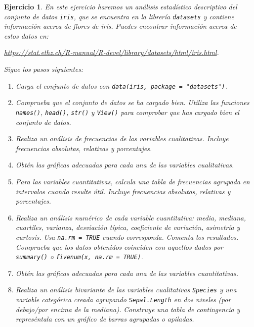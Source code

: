 \documentclass[11pt,a4paper]{article}
\theoremstyle{exercise}
\newtheorem{exercise}{Ejercicio}
\begin{document}
\begin{exercise} En este ejercicio haremos un análisis estadístico descriptivo del conjunto de datos \texttt{iris}, que se encuentra en la librería \texttt{datasets} y contiene información acerca de flores de iris. Puedes encontrar información acerca de estos datos en:

\begin{center}
	\url{https://stat.ethz.ch/R-manual/R-devel/library/datasets/html/iris.html}.
\end{center}

Sigue los pasos siguientes:

\begin{enumerate}
	\item Carga el conjunto de datos con \texttt{data(iris, package = "datasets")}.

	\item Comprueba que el conjunto de datos se ha cargado bien. Utiliza las funciones \texttt{names()}, \texttt{head()}, \texttt{str()} y \texttt{View()} para comprobar que has cargado bien el conjunto de datos.

	\item Realiza un análisis de frecuencias de las variables cualitativas. Incluye frecuencias absolutas, relativas y porcentajes.

	\item Obtén las gráficas adecuadas para cada una de las variables cualitativas. 

	\item Para las variables cuantitativas, calcula una tabla de frecuencias agrupada en intervalos cuando resulte útil. Incluye frecuencias absolutas, relativas y porcentajes.

	\item Realiza un análisis numérico de cada variable cuantitativa: media, mediana, cuartiles, varianza, desviación típica, coeficiente de variación, asimetría y curtosis. Usa \texttt{na.rm = TRUE} cuando corresponda. Comenta los resultados. Comprueba que los datos obtenidos coinciden con aquellos dados por \texttt{summary()} o \texttt{fivenum(x, na.rm = TRUE)}.

	\item Obtén las gráficas adecuadas para cada una de las variables cuantitativas.

	\item Realiza un análisis bivariante de las variables cualitativas \texttt{Species} y una variable categórica creada agrupando \texttt{Sepal.Length} en dos niveles (por debajo/por encima de la mediana). Construye una tabla de contingencia y represéntala con un gráfico de barras agrupadas o apiladas.


\end{enumerate}
\end{exercise}
\end{document}
